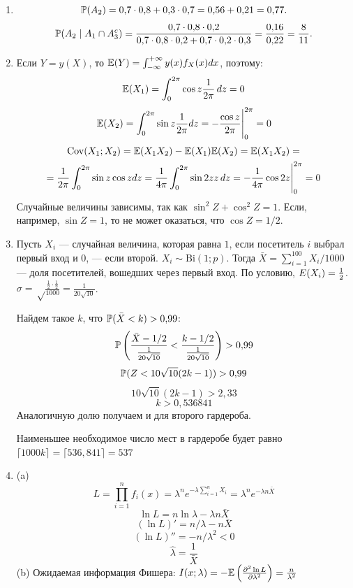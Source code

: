 \documentclass[12pt, a4paper]{article}\usepackage[]{graphicx}\usepackage[]{color}
\begin{document}
				\begin{enumerate}
					\item
					\[
					\P(A_2)=0{,}7\cdot0{,}8+0{,}3\cdot0{,}7=0{,}56+0{,}21=0{,}77.
					\]
					\[
					\P(A_2 \mid A_1 \cap A_3^c)=
					\frac{0{,}7\cdot0{,}8\cdot0{,}2}{0{,}7\cdot0{,}8\cdot0{,}2+0{,}7\cdot0{,}2\cdot0{,}3}=\frac{0{,}16}{0{,}22}=
					\frac{8}{11}.
					\]

					\item
					Если $Y=y(X)$, то $\E(Y)=\int_{-\infty}^{+\infty}y(x)f_X(x)dx$, поэтому:
					$$\E(X_1)=\int_0^{2\pi}\cos z\frac{1}{2\pi} \, dz=0$$
					$$\E(X_2)=\int_0^{2\pi}\sin z\frac{1}{2\pi} dz=-\frac{\cos z}{2\pi}\Bigg|^{2\pi}_0=0$$
					\begin{multline*}
					\Cov(X_1;X_2)=\E(X_1X_2)-\E(X_1)\E(X_2)=\E(X_1X_2)=\\
					=\frac{1}{2\pi}\int_0^{2\pi}\sin z \cos zdz=
					\frac{1}{4\pi}\int_0^{2\pi}\sin 2z z \,dz = -\frac{1}{4\pi}\cos2z\Bigg|^{2\pi}_0=0
					\end{multline*}
					Случайные величины зависимы, так как $\sin^2 Z+\cos^2 Z=1$. Если, например, $\sin Z=1$, то не может оказаться, что $\cos Z=1/2$.

					\item Пусть $X_i$ — случайная величина, которая равна $1$, если посетитель $i$ выбрал первый вход и $0$, — если второй. $X_i\sim \mathrm{Bi}(1;p)$. Тогда $\bar X=\sum_{i=1}^{100} X_i/1000$ — доля посетителей, вошедших через первый вход. По условию, $\\E(X_i)=\frac{1}{2}$. $\sigma=\sqrt\frac{\frac12\cdot\frac12}{1000}=\frac{1}{20\sqrt{10}}$.

					Найдем такое $k$, что $\P(\bar X<k)>0{,}99$:
					$$\P\left(\frac{\bar X-1/2}{\frac{1}{20\sqrt{10}}}<\frac{k-1/2}{\frac{1}{20\sqrt{10}}}\right)>0{,}99$$
					$$\P(Z<10\sqrt{10}(2k-1))>0{,}99$$
					$$10\sqrt{10}(2k-1)>2{,}33$$
					$$k>0{,}536841$$
					Аналогичную долю получаем и для второго гардероба.

					Наименьшее необходимое число мест в гардеробе будет равно $\lceil1000k\rceil=\lceil536{,}841\rceil=537$

					\item
					(a)
					$$L=\prod_{i=1}^nf_i(x)=\lambda^n e^{-\lambda\sum_{i=1}^nX_i}=\lambda^n e^{-\lambda n\bar X}$$
					$$\ln L=n\ln\lambda-\lambda n\bar X$$
					$$(\ln L)'=n/\lambda-n\bar X$$
					$$(\ln L)''=-n/\lambda^2<0$$
					$$\hat\lambda=\frac{1}{\bar X}$$
					(b) Ожидаемая информация Фишера:
					$ I(x;\lambda)=-\E\left(\frac{\partial^2\ln L}{\partial\lambda^2}\right)=\frac{n}{\lambda^2}$



\end{enumerate}
\end{document}
